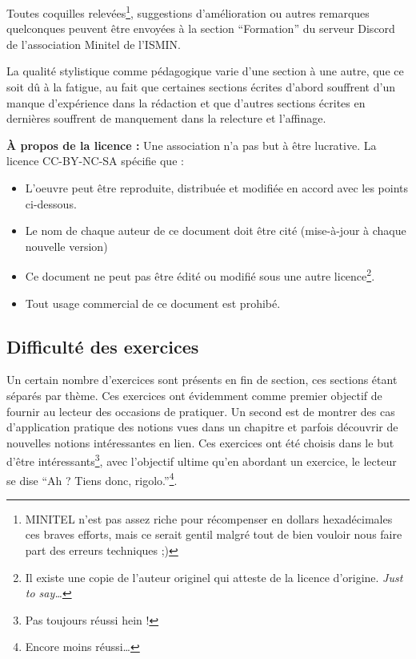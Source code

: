 \documentclass[../main.tex]{subfiles}
\begin{document}
\hrulefill

Toutes coquilles relevées\footnote{MINITEL n'est pas assez riche pour récompenser en dollars hexadécimales ces braves efforts, mais ce serait gentil malgré tout de bien vouloir nous faire part des erreurs techniques ;)}, suggestions d'amélioration ou autres remarques quelconques peuvent être envoyées à la section ``Formation'' du serveur Discord de l'association Minitel de l'ISMIN.

La qualité stylistique comme pédagogique varie d'une section à une autre, que ce soit dû à la fatigue, au fait que certaines sections écrites d'abord souffrent d'un manque d'expérience dans la rédaction et que d'autres sections écrites en dernières souffrent de manquement dans la relecture et l'affinage.

\textbf{À propos de la licence :} Une association n'a pas but à être lucrative. La licence \textsc{CC-BY-NC-SA} spécifie que :
\begin{itemize}
	\item L'oeuvre peut être reproduite, distribuée et modifiée en accord avec les points ci-dessous.
	\item Le nom de chaque auteur de ce document doit être cité (mise-à-jour à chaque nouvelle version)
	\item Ce document ne peut pas être édité ou modifié sous une autre licence\footnote{Il existe une copie de l'auteur originel qui atteste de la licence d'origine. \textit{Just to say\dots}}.
	\item Tout usage commercial de ce document est prohibé.
\end{itemize}

\hrulefill

\subsection*{Difficulté des exercices}

Un certain nombre d'exercices sont présents en fin de section, ces sections étant séparés par thème. Ces exercices ont évidemment comme premier objectif de fournir au lecteur des occasions de pratiquer. Un second est de montrer des cas d'application pratique des notions vues dans un chapitre et parfois découvrir de nouvelles notions intéressantes en lien. Ces exercices ont été choisis dans le but d'être intéressants\footnote{Pas toujours réussi hein !}, avec l'objectif ultime qu'en abordant un exercice, le lecteur se dise ``Ah ? Tiens donc, rigolo.''\footnote{Encore moins réussi\dots}.
\end{document}
